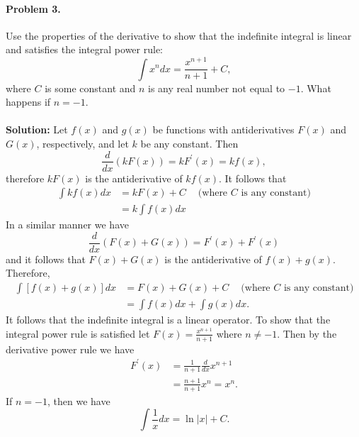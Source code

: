 \documentclass{article}
\begin{document}
\paragraph*{Problem 3.} Use the properties of the derivative to show that the indefinite integral is linear and satisfies the integral power rule:
\[
\int x^{n}dx=\frac{x^{n+1}}{n+1}+C,
\]
where $C$ is some constant and $n$ is any real number not equal to $-1$. What happens if $n=-1$.
~\\~\\
\textbf{Solution:} Let $f(x)$ and $g(x)$ be functions with antiderivatives $F(x)$ and $G(x)$, respectively, and let $k$ be any constant. Then
\[
\frac{d}{dx}\left(kF(x)\right)=kF^{'}(x)=kf(x),
\]
therefore $kF(x)$ is the antiderivative of $kf(x)$. It follows that
\begin{align*}
\int kf(x)dx &= kF(x)+C~\quad\text{(where $C$ is any constant)} \\
&=k\int f(x)dx
\end{align*}
In a similar manner we have
\[
\frac{d}{dx}\left(F(x)+G(x)\right)=F^{'}(x)+F^{'}(x)
\]
and it follows that $F(x)+G(x)$ is the antiderivative of $f(x)+g(x)$. Therefore,
\begin{align*}
\int [f(x)+g(x)]dx &= F(x)+G(x)+C~\quad\text{(where $C$ is any constant)} \\
&=\int f(x)dx + \int g(x)dx.
\end{align*}
It follows that the indefinite integral is a linear operator. To show that the integral power rule is satisfied let $F(x)=\frac{x^{n+1}}{n+1}$ where $n\neq -1$. Then by the derivative power rule we have
\begin{align*}
F^{'}(x)&=\frac{1}{n+1}\frac{d}{dx}x^{n+1} \\
&=\frac{n+1}{n+1}x^{n}=x^{n}.
\end{align*}
If $n=-1$, then we have
\[
\int \frac{1}{x}dx=\ln|x|+C.
\]
\end{document}
